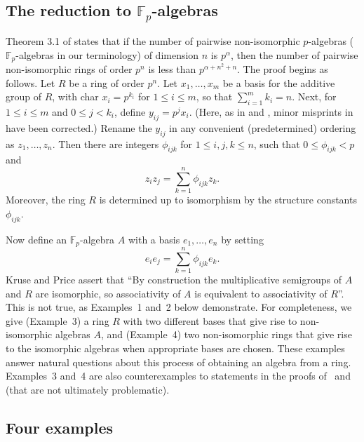 \documentclass[12pt]{article}
\begin{document}
\subsection*{The reduction to $\mathbb{F}_p$-algebras}

Theorem 3.1 of \cite{K & P} states that if the number of pairwise non-isomorphic $p$-algebras ($\mathbb{F}_p$-algebras in our terminology) of dimension $n$ is $p^{\alpha}$, then the number of pairwise non-isomorphic rings of order $p^{n}$ is less than $p^{\alpha + n^{2} + n}$. The proof begins as follows. Let $R$ be a ring of order $p^{n}$. Let $x_{1}, \ldots, x_{m}$ be a basis for the additive group of $R$, 
with char $x_{i} = p^{k_{i}}$ for $1 \leq i \leq m$, so that $\sum_{i=1}^{m}k_{i} = n$. Next, for $1 \leq i \leq m$ and $0 \leq j < k_{i}$, define $y_{ij} = p^{j}x_{i}$. (Here, as in \cite{K & P book} and \cite{Poonen}, minor misprints in \cite{K & P} have been corrected.) Rename the $y_{ij}$ in any convenient (predetermined) ordering as $z_{1}, \ldots, z_{n}$. Then there are integers $\phi_{ijk}$ for $1 \leq i, j, k \leq n$, such that $0 \leq \phi_{ijk} < p$ and
\begin{displaymath}
z_{i}z_{j} = \sum_{k=1}^{n}\phi_{ijk}z_{k}.
\end{displaymath}
Moreover, the ring $R$ is determined up to isomorphism by the structure constants $\phi_{ijk}$. \par Now define an $\mathbb{F}_p$-algebra $A$ with a basis $e_{1}, \ldots, e_{n}$ by setting
\begin{displaymath}
e_{i}e_{j} = \sum_{k=1}^{n}\phi_{ijk}e_{k}.
\end{displaymath}
Kruse and Price assert that ``By construction the multiplicative semigroups of $A$ and $R$ are isomorphic, so associativity of $A$ is equivalent to associativity of $R$''. This is not true, as Examples~1 and~2 below demonstrate. For completeness, we give (Example~3) a ring $R$ with two different bases that give rise to non-isomorphic algebras $A$, and (Example~4) two non-isomorphic rings that give rise to the isomorphic algebras when appropriate bases are chosen. These examples answer natural questions about this process of obtaining an algebra from a ring. Examples~3 and~4 are also counterexamples to statements in the proofs of~\cite[Theorem~3.1]{K & P} and~\cite[Lemma~11.1]{Poonen} (that are not ultimately problematic). \\

\subsection*{Four examples}
\end{document}
